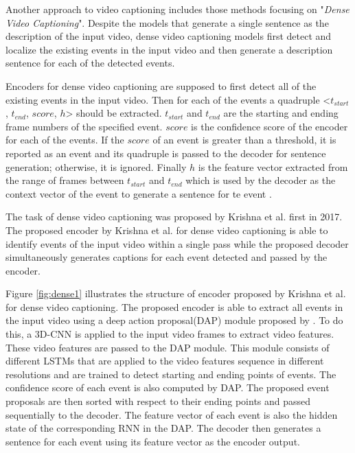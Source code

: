\documentclass[preprint, 12pt]{elsarticle}
\begin{document}
		Another approach to video captioning includes those methods focusing on "\textit{Dense Video Captioning}". Despite the models that generate a single sentence as the description of the input video, dense video captioning models first detect and localize the existing events in the input video and then generate a description sentence for each of the detected events. 
		
		Encoders for dense video captioning are supposed to first detect all of the existing events in the input video. Then for each of the events a quadruple <$t_{start}$, $t_{end}$, $score$, $h$> should be extracted. $t_{start}$ and $t_{end}$ are the starting and ending frame numbers of the specified event. $score$ is the confidence score of the encoder for each of the events. If the $score$ of an event is greater than a threshold, it is reported as an event and its quadruple is passed to the decoder for sentence generation; otherwise, it is ignored. Finally $h$ is the feature vector extracted from the range of frames between $t_{start}$ and $t_{end}$ which is used by the decoder as the context vector of the event to generate a sentence for te event \cite{li2018jointly}. 
		
		The task of dense video captioning was proposed by Krishna et al. \cite{krishna2017dense} first in 2017. The proposed encoder by Krishna et al. \cite{krishna2017dense} for dense video captioning is able to identify events of the input video within a single pass while the proposed decoder simultaneously generates captions for each event detected and passed by the encoder.
		
		Figure \ref{fig:dense1} illustrates the structure of encoder proposed by Krishna et al. \cite{krishna2017dense} for dense video captioning. The proposed encoder is able to extract all events in the input video using a deep action proposal(DAP) module proposed by \cite{escorcia2016daps}. To do this, a 3D-CNN is applied to the input video frames to extract video features. These video features are passed to the DAP module. This module consists of different LSTMs that are applied to the video features sequence in different resolutions and are trained to detect starting and ending points of events. The confidence score of each event is also computed by DAP. The proposed event proposals are then sorted with respect to their ending points and passed sequentially to the decoder. The feature vector of each event is also the hidden state of the corresponding RNN in the DAP. The decoder then generates a sentence for each event using its feature vector as the encoder output.
		
\end{document}
